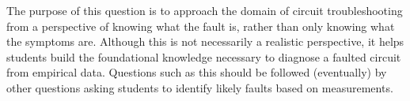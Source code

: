 





The purpose of this question is to approach the domain of circuit troubleshooting from a perspective of knowing what the fault is, rather than only knowing what the symptoms are.  Although this is not necessarily a realistic perspective, it helps students build the foundational knowledge necessary to diagnose a faulted circuit from empirical data.  Questions such as this should be followed (eventually) by other questions asking students to identify likely faults based on measurements.





